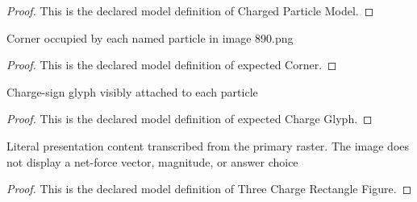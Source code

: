 \begin{proof}
  This is the declared model definition of Charged Particle Model.
\end{proof}
\begin{definition}
  \label{def:physics:phyx-mini-0890:phyxminiproblems-problemphyxmini0890-expectedcorner}
  Corner occupied by each named particle in image 890.png
\end{definition}
\begin{proof}
  This is the declared model definition of expected Corner.
\end{proof}
\begin{definition}
  \label{def:physics:phyx-mini-0890:phyxminiproblems-problemphyxmini0890-expectedchargeglyph}
  Charge-sign glyph visibly attached to each particle
\end{definition}
\begin{proof}
  This is the declared model definition of expected Charge Glyph.
\end{proof}
\begin{definition}
  \label{def:physics:phyx-mini-0890:phyxminiproblems-problemphyxmini0890-threechargerectanglefigure}
  Literal presentation content transcribed from the primary raster. The image does not display a net-force vector, magnitude, or answer choice
\end{definition}
\begin{proof}
  This is the declared model definition of Three Charge Rectangle Figure.
\end{proof}
